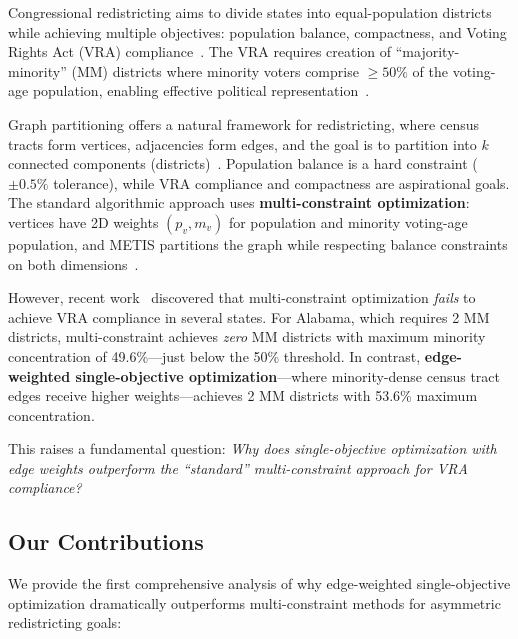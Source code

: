 Congressional redistricting aims to divide states into equal-population districts while achieving multiple objectives: population balance, compactness, and Voting Rights Act (VRA) compliance~\cite{altman2011redistricting}. The VRA requires creation of ``majority-minority'' (MM) districts where minority voters comprise $\geq50\%$ of the voting-age population, enabling effective political representation~\cite{grofman2001impact}.

Graph partitioning offers a natural framework for redistricting, where census tracts form vertices, adjacencies form edges, and the goal is to partition into $k$ connected components (districts)~\cite{karypis1998fast}. Population balance is a hard constraint ($\pm0.5\%$ tolerance), while VRA compliance and compactness are aspirational goals. The standard algorithmic approach uses \textbf{multi-constraint optimization}: vertices have 2D weights $(p_v, m_v)$ for population and minority voting-age population, and METIS partitions the graph while respecting balance constraints on both dimensions~\cite{karypis1999multilevel}.

However, recent work~\cite{dellaLibera2026edgeWeighted} discovered that multi-constraint optimization \textit{fails} to achieve VRA compliance in several states. For Alabama, which requires 2 MM districts, multi-constraint achieves \textit{zero} MM districts with maximum minority concentration of 49.6\%---just below the 50\% threshold. In contrast, \textbf{edge-weighted single-objective optimization}---where minority-dense census tract edges receive higher weights---achieves 2 MM districts with 53.6\% maximum concentration.

This raises a fundamental question: \textit{Why does single-objective optimization with edge weights outperform the ``standard'' multi-constraint approach for VRA compliance?}

\subsection{Our Contributions}

We provide the first comprehensive analysis of why edge-weighted single-objective optimization dramatically outperforms multi-constraint methods for asymmetric redistricting goals:

